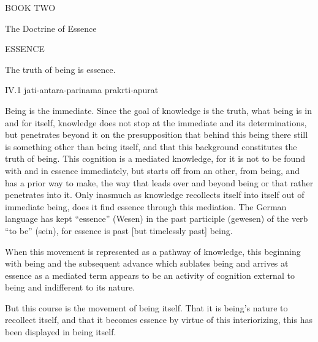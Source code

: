 BOOK TWO

The Doctrine of Essence

ESSENCE

The truth of being is essence.

IV.1
jati-antara-parinama prakrti-apurat

Being is the immediate.
Since the goal of knowledge is the truth,
what being is in and for itself,
knowledge does not stop at
the immediate and its determinations,
but penetrates beyond it on
the presupposition that
behind this being there still is
something other than being itself,
and that this background
constitutes the truth of being.
This cognition is a mediated knowledge,
for it is not to be found
with and in essence immediately,
but starts off from an other, from being,
and has a prior way to make,
the way that leads over and beyond being
or that rather penetrates into it.
Only inasmuch as knowledge recollects
itself into itself out of immediate being,
does it find essence through this mediation.
The German language has kept “essence” (Wesen)
in the past participle (gewesen) of the verb “to be” (sein),
for essence is past [but timelessly past] being.

When this movement is represented as a pathway of knowledge,
this beginning with being and the subsequent advance
which sublates being and arrives at essence as a mediated term
appears to be an activity of cognition external to being
and indifferent to its nature.

But this course is the movement of being itself.
That it is being's nature to recollect itself,
and that it becomes essence by virtue of this interiorizing,
this has been displayed in being itself.

